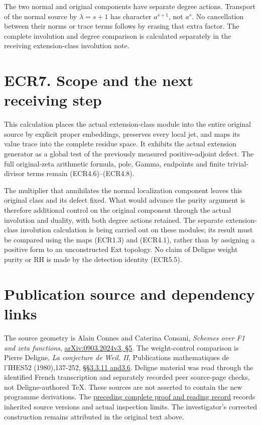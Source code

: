 The two normal and original components have separate degree actions.
Transport of the normal source by \(\lambda=s+1\) has character
\(a^{s+1}\), not \(a^s\). No cancellation between their norms or trace
terms follows by erasing that extra factor. The complete involution and
degree comparison is calculated separately in the receiving
extension-class involution note.

\section{ECR7. Scope and the next receiving
step}\label{ecr7.-scope-and-the-next-receiving-step}

This calculation places the actual extension-class module into the
entire original source by explicit proper embeddings, preserves every
local jet, and maps its value trace into the complete residue space. It
exhibits the actual extension generator as a global test of the
previously measured positive-adjoint defect. The full original-zeta
arithmetic formula, pole, Gamma, endpoints and finite trivial-divisor
terms remain (ECR4.6)--(ECR4.8).

The multiplier that annihilates the normal localization component leaves
this original class and its defect fixed. What would advance the purity
argument is therefore additional control on the original component
through the actual involution and duality, with both degree actions
retained. The separate extension-class involution calculation is being
carried out on these modules; its result must be compared using the maps
(ECR1.3) and (ECR4.1), rather than by assigning a positive form to an
unconstructed Ext topology. No claim of Deligne weight purity or RH is
made by the detection identity (ECR5.5).

\section{Publication source and dependency
links}\label{publication-source-and-dependency-links-2}

The source geometry is Alain Connes and Caterina Consani, \emph{Schemes
over F1 and zeta functions},
\href{https://arxiv.org/abs/0903.2024v3}{arXiv:0903.2024v3, §5}. The
weight-control comparison is Pierre Deligne, \emph{La conjecture de
Weil. II}, Publications mathematiques de l'IHES52 (1980),137-252,
\href{https://www.numdam.org/item/PMIHES_1980__52__137_0/}{§§3.3.11
and3.6}. Deligne material was read through the identified French
transcription and separately recorded peer source-page checks, not
Deligne-authored TeX. These sources are not asserted to contain the new
programme derivations. The
\href{https://github.com/KokunoYumeto/zeta-function-research-reader/blob/36a82ecca98addb8a98b48204e349737856c7223/workbenches/splitzero-tandem/continuations/20260924-cohomology-weight-and-character-lifts/BUILD_AND_REVIEW.md}{preceding
complete proof and reading record} records inherited source versions and
actual inspection limits. The investigator's corrected construction
remains attributed in the original text above.

